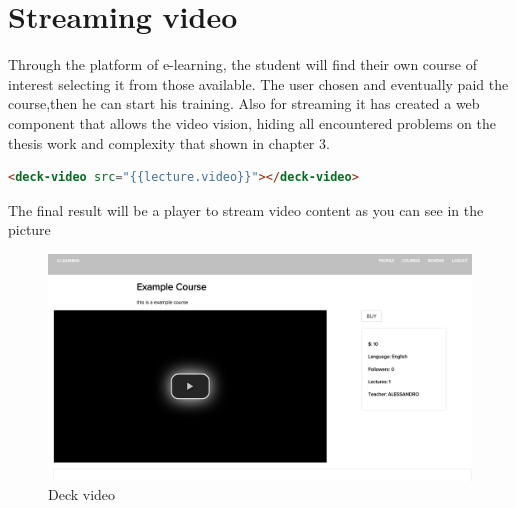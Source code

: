 \section{Streaming video}
\label{sec:attend_the_course}

Through the platform of e-learning, the student will find their own course of interest selecting it from those available.
The user chosen and eventually paid the course,then he can start his training.
Also for streaming it has created a web component that allows the video vision, hiding all encountered problems on the thesis work and complexity that shown in chapter 3.

\begin{lstlisting}[language=html]
       <deck-video src="{{lecture.video}}"></deck-video>
\end{lstlisting}

The final result will be a player to stream video content as you can see in the picture

\begin{figure}[htb]
 \centering
 \includegraphics[width=1.0\linewidth]{images/chapter6/deck_video.png}\hfill
 \caption[Deck video]{Deck video}
 \label{fig:fourV}
\end{figure}
